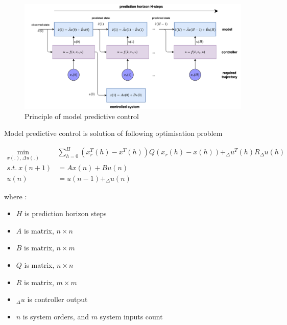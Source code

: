 \documentclass[12pt,twoside,onecolumn,openany,extrafontsizes,dvipsnames]{memoir}
\begin{document}
        \begin{figure}[!htb]
            \centering
            \includegraphics[scale=0.5]{../diagrams/control/control-mpc_steps.png}
            \caption{Principle of model predictive control}
            \label{fig:mpc_steps}
        \end{figure}
        
        Model predictive control is solution of following optimisation problem

        \begin{align}
            \min_{x(.), \Delta u(.)} &\sum_{h=0}^H (x_r^T(h) - x^T(h))Q(x_r(h) - x(h)) + _\Delta u^T(h)R_\Delta u(h) \\
            s.t.\ x(n+1) &= Ax(n) + Bu(n) \\
            u(n) &= u(n-1) + _\Delta u(n)
        \end{align}

        where : 
        \begin{itemize}
          \item $H$ is prediction horizon steps
          \item $A$ is matrix, $n \times n$
          \item $B$ is matrix, $n \times m$
          \item $Q$ is matrix, $n \times n$
          \item $R$ is matrix, $m \times m$
          \item $_\Delta u$ is controller output
          \item $n$ is system orders, and $m$ system inputs count
        \end{itemize}
\end{document}
